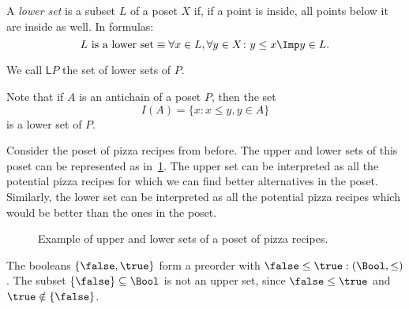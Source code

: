 \begin{definition}
\label{def:lowerset}
A \emph{lower set} is a subset $L$ of a poset $X$ if, if a point is inside, all points below it are inside as well. In formulas:
\begin{equation}
\text{$L$ is a lower set} \equiv \forall x\in L, \forall y\in X\colon y\leq x \Imp y\in L.
\end{equation}
\end{definition}
\begin{remark}
We call $\mathsf{L}P$ the set of lower sets of $P$.
\end{remark}

\begin{remark}
Note that if $A$ is an antichain of a poset $P$, then the set
\begin{equation}
    I(A)=\{x\colon x\leq y, y\in A\}
\end{equation}
is a lower set of $P$.
\end{remark}



Consider the poset of pizza recipes from before. The upper and lower sets of this poset can be represented as in~\cref{fig:upperset}. The upper set can be interpreted as all the potential pizza recipes for which we can find better alternatives in the poset. Similarly, the lower set can be interpreted as all the potential pizza recipes which would be better than the ones in the poset.

\begin{figure}[h!]
\begin{center}
\end{center}
\caption{Example of upper and lower sets of a poset of pizza recipes. \label{fig:upperset}}
\end{figure}
\begin{example}
The booleans $\{\false, \true \}$ form a preorder with $\false \leq \true:(\Bool,\leq)$ . The subset $\{\false\} \subseteq \Bool$ is not an upper set, since $\false \leq \true$ and $\true \notin \{\false \}$.	
\end{example}

